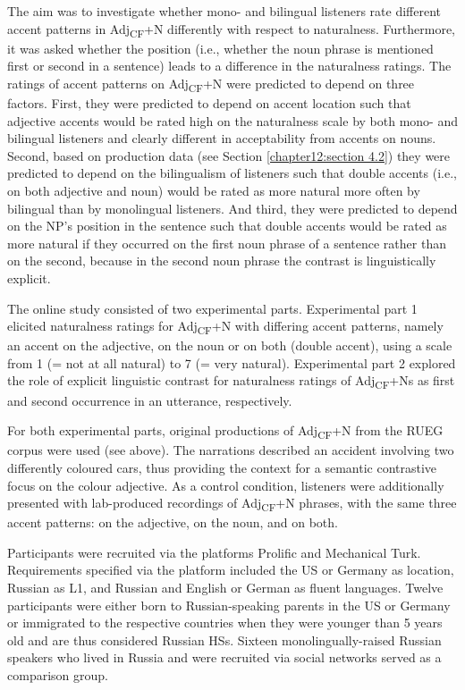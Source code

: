 \documentclass[output=paper,colorlinks,citecolor=brown]{langscibook}
\begin{document}
The aim was to investigate whether mono- and bilingual listeners rate different accent patterns in Adj\textsubscript{CF}+N differently with respect to naturalness. Furthermore, it was asked whether the position (i.e., whether the noun phrase is mentioned first or second in a sentence) leads to a difference in the naturalness ratings. The ratings of accent patterns on Adj\textsubscript{CF}+N were predicted to depend on three factors. First, they were predicted to depend on accent location such that adjective accents would be rated high on the naturalness scale by both mono- and bilingual listeners and clearly different in acceptability from accents on nouns. Second, based on production data (see Section  \ref{chapter12:section 4.2}) they were predicted to depend on the bilingualism of listeners such that double accents (i.e., on both adjective and noun) would be rated as more natural more often by bilingual than by monolingual listeners. And third, they were predicted to depend on the NP's position in the sentence such that double accents would be rated as more natural if they occurred on the first noun phrase of a sentence rather than on the second, because in the second noun phrase the contrast is linguistically explicit.

The online study consisted of two experimental parts. Experimental part 1 elicited naturalness ratings for Adj\textsubscript{CF}+N with differing accent patterns, namely an accent on the adjective, on the noun or on both (double accent), using a scale from 1 (= not at all natural) to 7 (= very natural). Experimental part 2 explored the role of explicit linguistic contrast for naturalness ratings of Adj\textsubscript{CF}+Ns as first and second occurrence in an utterance, respectively.

For both experimental parts, original productions of Adj\textsubscript{CF}+N from the RUEG corpus were used (see  above). The narrations described an accident involving two differently coloured cars, thus providing the context for a semantic contrastive focus on the colour adjective. As a control condition, listeners were additionally presented with lab-produced recordings of Adj\textsubscript{CF}+N phrases, with the same three accent patterns: on the adjective, on the noun, and on both. 

Participants were recruited via the platforms Prolific and Mechanical Turk. Requirements specified via the platform included the US or Germany as location, Russian as L1, and Russian and English or German as fluent languages. Twelve participants were either born to Russian-speaking parents in the US or Germany or immigrated to the respective countries when they were younger than 5 years old and are thus considered Russian HSs. Sixteen monolingually-raised Russian speakers who lived in Russia and were recruited via social networks served as a comparison group. 
\end{document}
